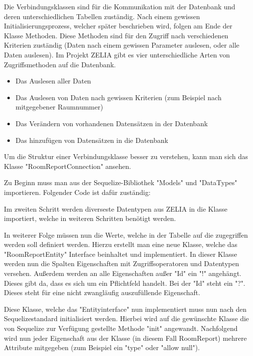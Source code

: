 
Die Verbindungsklassen sind für die Kommunikation mit der Datenbank und deren unterschiedlichen Tabellen zuständig. Nach einem gewissen Initialisierungsprozess, welcher später beschrieben wird, folgen am Ende der Klasse Methoden. Diese Methoden sind für den Zugriff nach verschiedenen Kriterien zuständig (Daten nach einem gewissen Parameter auslesen, oder alle Daten auslesen). Im Projekt ZELIA gibt es vier unterschiedliche Arten von Zugriffsmethoden auf die Datenbank.

\begin{itemize}
    \item Das Auslesen aller Daten
    \item Das Auslesen von Daten nach gewissen Kriterien (zum Beispiel nach mitgegebener Raumnummer)
    \item Das Verändern von vorhandenen Datensätzen in der Datenbank
    \item Das hinzufügen von Datensätzen in die Datenbank
\end{itemize}

Um die Struktur einer Verbindungsklasse besser zu verstehen, kann man sich das Klasse "RoomReportConnection" ansehen.

Zu Beginn muss man aus der Sequelize-Bibliothek "Models" und "DataTypes" importieren. Folgender Code ist dafür zuständig:


Im zweiten Schritt werden diverseste Datentypen aus ZELIA in die Klasse importiert, welche in weiteren Schritten benötigt werden.

In weiterer Folge müssen nun die Werte, welche in der Tabelle auf die zugegriffen werden soll definiert werden. Hierzu erstellt man eine neue Klasse, welche das "RoomReportEntity" Interface beinhaltet und implementiert. In dieser Klasse werden nun die Spalten Eigenschaften mit Zugriffsoperatoren und Datentypen versehen. Außerdem werden an alle Eigenschaften außer "Id" ein "!" angehängt. Dieses gibt da, dass es sich um ein Pflichtfeld handelt. Bei der "Id" steht ein "?". Dieses steht für eine nicht zwangläufig auszufüllende Eigenschaft.


Diese Klasse, welche das "Entityinterface" nun implementiert muss nun nach den Sequelizestandard initialisiert werden. Hierbei wird auf die gewünschte Klasse die von Sequelize zur Verfügung gestellte Methode "init" angewandt. Nachfolgend wird nun jeder Eigenschaft aus der Klasse (in diesem Fall RoomReport) mehrere Attribute mitgegeben (zum Beispiel ein "type" oder "allow null").

